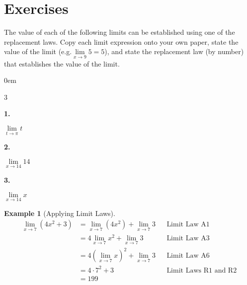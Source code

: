 \documentclass[12pt,]{book}
\theoremstyle{plain}
\theoremstyle{definition}
\newtheorem{example}[theorem]{Example}
\numberwithin{equation}{section}
\newenvironment{exercisegroup}%
{\medskip\noindent}%
{\par\bigskip}%
\newlength{\exercisegroupindent}%
\newlength{\exercisegroupitemwidth}%
\newenvironment{exercisegrouplist}%
{\vspace{-\partopsep}%
\begin{adjustwidth}{\exercisegroupindent}{0em}}%
{\end{adjustwidth}%
\vspace{-\partopsep}%
\vspace{\baselineskip}}%
\newenvironment{exercisegroupbycol}[1]%
{\begin{exercisegrouplist}%
\vspace{-\multicolsep}%
\begin{multicols}{#1}%
\setlength{\parindent}{0em}%
\setlength{\exercisegroupitemwidth}{\linewidth}}%
{\end{multicols}%
\vspace{-\multicolsep}%
\end{exercisegrouplist}}%
\newenvironment{exercisegroupitem}[1]%
{\begin{minipage}[t]{\exercisegroupitemwidth}
\vspace{0pt}%
{\bfseries#1}%
\rule{0pt}{\baselineskip}}{\strut%
\end{minipage}%
\hspace{\columnsep}}%
\providecommand\phantomsection{}
\begin{document}
\section*{Exercises}\label{exercises-6}

\begin{exercisegroup}%
The value of each of the following limits can be established using one of the replacement laws. Copy each limit expression onto your own paper, state the value of the limit (e.g.\@ \(\lim\limits_{x\to9}5=5\)), and state the replacement law (by number) that establishes the value of the limit.%
\par
\begin{exercisegroupbycol}{3}%
\begin{exercisegroupitem}{1. }\phantomsection\hypertarget{exercise-66}{\null}
\(\lim\limits_{t\to\pi}t\)%
\end{exercisegroupitem}%
\par%
\begin{exercisegroupitem}{2. }\phantomsection\hypertarget{exercise-67}{\null}
\(\lim\limits_{x\to14}14\)%
\end{exercisegroupitem}%
\par%
\begin{exercisegroupitem}{3. }\phantomsection\hypertarget{exercise-68}{\null}
\(\lim\limits_{x\to14}x\)%
\end{exercisegroupitem}%
\par%
\end{exercisegroupbycol}%
\end{exercisegroup}%
\begin{example}[Applying Limit Laws]\label{example-apply-limit-laws}
\begin{align*}
\lim_{x\to7}\left(4x^2+3\right)&=\lim_{x\to7}\left(4x^2\right)+\lim_{x\to7}3&&\text{Limit Law A1}\\
&=4\lim_{x\to7}x^2+\lim_{x\to7}3&&\text{Limit Law A3}\\
&=4\left(\lim_{x\to7}x\right)^2+\lim_{x\to7}3&&\text{Limit Law A6}\\
&=4\cdot7^2+3&&\text{Limit Laws R1 and R2}\\
&=199
\end{align*}%
\end{example}
\end{document}
